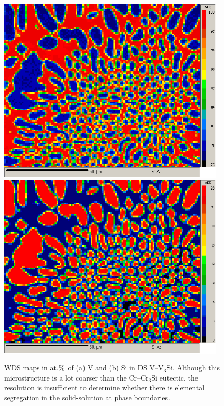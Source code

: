 %
\begin{landscape}
\begin{figure}
\begin{center}
\includegraphics[width=11cm]{veutVmap}
\includegraphics[width=11cm]{veutSimap}
\caption{WDS maps in at.\%\ of (a) V and (b) Si in DS V--V$_3$Si.  Although this microstructure is a lot coarser than the Cr--Cr$_3$Si eutectic, the resolution is insufficient to determine whether there is elemental segregation in the solid-solution at phase boundaries.}
\label{fig:veutmap}
\end{center}
\end{figure}
\end{landscape}
%
%
%


